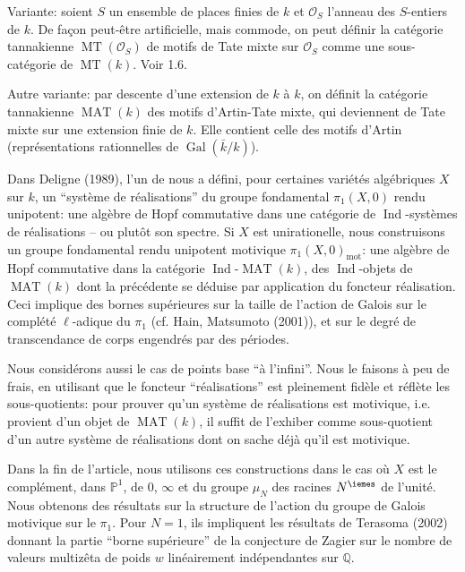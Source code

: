 \documentclass[11pt,a4paper]{article}
\theoremstyle{plain}
\theoremstyle{definition}
\theoremstyle{remark}
\DeclareMathOperator{\Gal}{Gal}
\DeclareMathOperator{\Ind}{Ind}
\DeclareMathOperator{\MAT}{MAT}
\DeclareMathOperator{\MT}{MT}
\DeclareMathOperator{\mot}{mot}
\newcommand{\dbP}{\mathbb{P}}
\newcommand{\dbQ}{\mathbb{Q}}
\newcommand{\scrO}{\mathscr{O}}
\newcommand{\kbar}{\bar{k}}
\providecommand{\Gal}{\operatorname{Gal}}
\providecommand{\mot}{\mathrm{mot}}
\begin{document}
Variante: soient $S$ un ensemble de places
finies de $k$ et $\scrO_S$ l'anneau des
$S$-entiers de $k$.
De fa\c{c}on peut-\^{e}tre artificielle, mais
commode, on peut d\'efinir la cat\'egorie
tannakienne $\MT(\scrO_S)$ de motifs de Tate
mixte sur $\scrO_S$ comme une
sous-cat\'egorie de $\MT(k)$.
Voir 1.6.

Autre variante: par descente d'une extension
de $k$ \`a $k$, on d\'efinit la cat\'egorie
tannakienne $\MAT(k)$ des motifs  d'Artin-Tate 
mixte, qui deviennent
de Tate mixte sur une extension finie de $k$.
Elle contient celle des motifs d'Artin
(repr\'esentations rationnelles de
$\Gal(\kbar/k)$).

Dans Deligne (1989), l'un de nous a
d\'efini, pour certaines vari\'et\'es
alg\'ebriques $X$ sur $k$, un ``syst\`eme de
r\'ealisations'' du groupe fondamental
$\pi_1(X,0)$ rendu unipotent: une alg\`ebre de
Hopf commutative dans une cat\'egorie de
$\Ind$-syst\`emes de r\'ealisations -- ou
plut\^{o}t son spectre.
Si $X$ est unirationelle, nous construisons un
groupe fondamental rendu unipotent motivique
$\pi_1(X,0)_{\mot}$: une alg\`ebre de Hopf
commutative dans la cat\'egorie 
$\Ind$-$\MAT(k)$, des $\Ind$-objets de
$\MAT(k)$ dont la
pr\'ec\'edente se d\'eduise par application du
foncteur r\'ealisation.
Ceci implique des bornes sup\'erieures sur la
taille de l'action de Galois sur le
compl\'et\'e $\ell$-adique du $\pi_1$ 
(cf. Hain, Matsumoto (2001)), et sur le degr\'e de 
transcendance de corps engendr\'es par des
p\'eriodes.

Nous consid\'erons aussi le cas de points base
``\`a l'infini''.
Nous le faisons \`a peu de frais, en utilisant
que le foncteur ``r\'ealisations'' est
pleinement fid\`ele et r\'efl\`ete les
sous-quotients: pour prouver qu'un syst\`eme
de r\'ealisations est motivique, i.e. provient
d'un objet de $\MAT(k)$, il suffit de
l'exhiber comme sous-quotient d'un autre
syst\`eme de r\'ealisations dont on sache
d\'ej\`a qu'il est motivique. 

Dans la fin de l'article, nous utilisons ces
constructions dans le cas o\`u $X$ est le
compl\'ement, dans $\dbP^1$, de $0$, $\infty$ et
du groupe $\mu_N$ des racines $N^{\iemes}$ de
l'unit\'e.
Nous obtenons des r\'esultats sur la
structure de l'action 
du groupe de  Galois motivique sur le $\pi_1$.
Pour $N=1$, ils impliquent les r\'esultats de
Terasoma (2002) donnant la partie ``borne
sup\'erieure'' de la conjecture de Zagier sur
le nombre de valeurs multiz\^{e}ta de poids
$w$ lin\'eairement ind\'ependantes sur
$\dbQ$.
\end{document}
